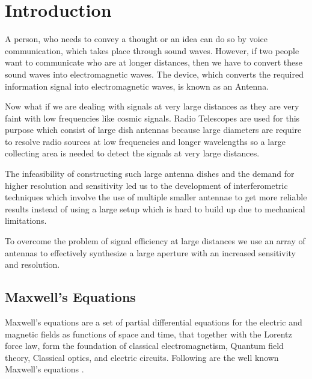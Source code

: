 \chapter{Introduction}

A person, who needs to convey a thought or an idea can do so by voice communication, which takes place through sound waves. However, if two people want to communicate who are at longer distances, then we have to convert these sound waves into electromagnetic waves. The device, which converts the required information signal into electromagnetic waves, is known as an Antenna.

Now what if we are dealing with signals at very large distances as they are very faint with low frequencies like cosmic signals. Radio Telescopes are used for this purpose which consist of large dish antennas because large diameters are require to resolve radio sources at low frequencies and longer wavelengths so a large collecting area is needed to detect the signals at very large distances.

The infeasibility of constructing such large antenna dishes and the demand for higher resolution and sensitivity led us to the development of interferometric techniques which involve the use of multiple smaller antennae to get more reliable results instead of using a large setup which is hard to build up due to mechanical limitations.

To overcome the problem of signal efficiency at large distances we use an array of antennas to effectively synthesize a large aperture with an increased sensitivity and resolution.
 

\section{Maxwell's Equations}

Maxwell’s equations are a set of partial differential equations for the electric and magnetic fields as functions of space and time, that together with the Lorentz force law, form the foundation of classical electromagnetism, Quantum field theory, Classical optics, and electric circuits. Following are the well known Maxwell's equations \cite{griffiths1962introduction}.

